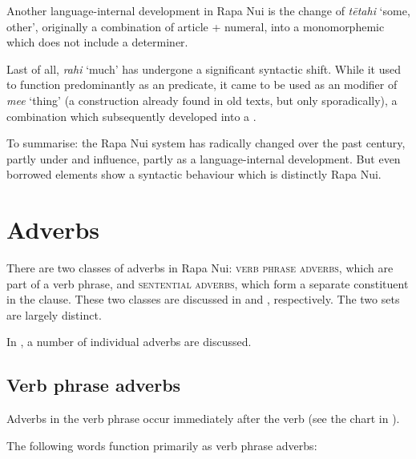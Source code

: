 Another language-internal development in Rapa Nui is the change of \textit{tētahi} ‘some, other’, originally a combination of article + numeral, into a monomorphemic  which does not include a determiner.

Last of all, \textit{rahi} ‘much’ has undergone a significant syntactic shift. While it used to function predominantly as an  predicate, it came to be used as an  modifier of \textit{me{\ꞌ}e} ‘thing’ (a construction already found in old texts, but only sporadically), a combination which subsequently developed into a .

To summarise: the Rapa Nui  system has radically changed over the past century, partly under  and  influence, partly as a language-internal development. But even borrowed elements show a syntactic behaviour which is distinctly Rapa Nui.
\section{Adverbs}\label{sec:4.5}

There are two classes of adverbs in Rapa Nui: \textsc{verb phrase} \textsc{adverbs}, which are part of a verb phrase, and \textsc{sentential adverbs}, which form a separate constituent in the clause. These two classes are discussed in  and , respectively. The two sets are largely distinct. 

In , a number of individual adverbs are discussed.

\subsection{Verb phrase adverbs}\label{sec:4.5.1}
Adverbs in the verb phrase occur immediately after the verb (see the chart in ). 

The following words function primarily as verb phrase adverbs: 

